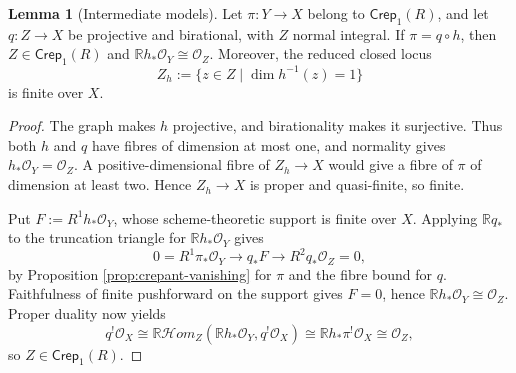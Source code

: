 \documentclass[a4paper,reqno]{amsart}
\def\O{\mathcal{O}}
\theoremstyle{definition}
\newtheorem{Lem}[Thm]{Lemma}
\begin{document}
\begin{Lem}[Intermediate models]\label{lem:intermediate-contraction-vanishing}
Let $\pi\colon Y\to X$ belong to $\mathsf{Crep}_1(R)$, and let $q\colon Z\to X$ be projective and birational, with $Z$ normal integral. If $\pi=q\circ h$, then $Z\in\mathsf{Crep}_1(R)$ and $\mathbb Rh_*\O_Y\cong\O_Z$. Moreover, the reduced closed locus
\[
Z_h:=\{z\in Z\mid\dim h^{-1}(z)=1\}
\]
is finite over $X$.
\end{Lem}
\begin{proof}
The graph makes $h$ projective, and birationality makes it surjective. Thus both $h$ and $q$ have fibres of dimension at most one, and normality gives $h_*\O_Y=\O_Z$. A positive-dimensional fibre of $Z_h\to X$ would give a fibre of $\pi$ of dimension at least two. Hence $Z_h\to X$ is proper and quasi-finite, so finite.

Put $F:=R^1h_*\O_Y$, whose scheme-theoretic support is finite over $X$. Applying $\mathbb Rq_*$ to the truncation triangle for $\mathbb Rh_*\O_Y$ gives
\[
0=R^1\pi_*\O_Y\longrightarrow q_*F\longrightarrow R^2q_*\O_Z=0,
\]
by Proposition \ref{prop:crepant-vanishing} for $\pi$ and the fibre bound for $q$. Faithfulness of finite pushforward on the support gives $F=0$, hence $\mathbb Rh_*\O_Y\cong\O_Z$. Proper duality now yields
\[
q^!\O_X
\cong\mathbb R\mathcal Hom_Z(\mathbb Rh_*\O_Y,q^!\O_X)
\cong\mathbb Rh_*\pi^!\O_X
\cong\O_Z,
\]
so $Z\in\mathsf{Crep}_1(R)$.
\end{proof}
\end{document}
